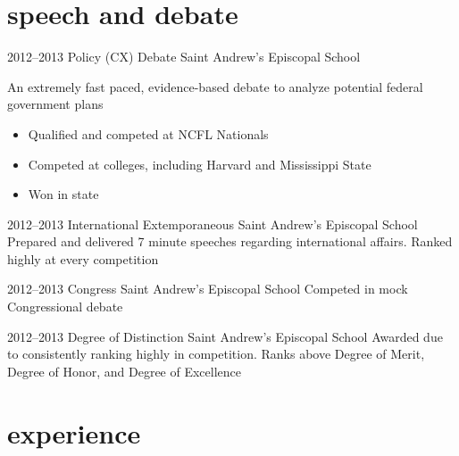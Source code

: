 \documentclass[]{friggeri-cv} %
\begin{document}
\pagebreak


\section{speech and debate}

\begin{entrylist}

	\entry
	{2012--2013}
	{Policy (CX) Debate}
	{Saint Andrew's Episcopal School}
	{An extremely fast paced, evidence-based debate to analyze potential federal government plans
		\begin{itemize}
			\item Qualified and competed at NCFL Nationals
			\item Competed at colleges, including Harvard and Mississippi State
			\item Won  in state
		\end{itemize}
	}


	\entry
	{2012--2013}
	{International Extemporaneous}
	{Saint Andrew's Episcopal School}
	{Prepared and delivered 7 minute speeches regarding international affairs. Ranked highly at every competition}


	\entry
	{2012--2013}
	{Congress}
	{Saint Andrew's Episcopal School}
	{Competed in mock Congressional debate}


	\entry
	{2012--2013}
	{Degree of Distinction}
	{Saint Andrew's Episcopal School}
	{Awarded due to consistently ranking highly in competition. Ranks above Degree of Merit, Degree of Honor, and Degree of Excellence}

\end{entrylist}


\section{experience}
\end{document}
